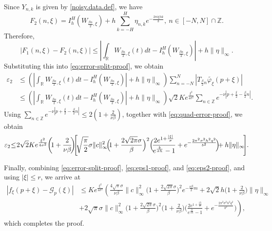 \documentclass[11pt, reqno]{amsart}
\newcommand{\Z}{\mathbb{Z}}
\newcommand{\R}{\mathbb{R}}
\numberwithin{equation}{section}
\begin{document}
\begin{appendices}
Since  $Y_{n,k}$ is given by  \eqref{noisy.data.def}, we have 
$$ F_2(n,\xi) = I_h^H(W_{\frac{\beta n}{2},\xi}) + h\sum_{k=-H}^{H}\eta_{n,k}e^{-\frac{2\pi i\xi hk}{b}},  \ n\in[-N,N]\cap\Z. $$
Therefore,
$$ |F_1(n,\xi)-F_2(n,\xi)| \le \left| \int_{\R}W_{\frac{\beta n}{2},\xi}(t) dt - I_h^H(W_{\frac{\beta n}{2},\xi}) \right| + h\|\eta\|_\infty.$$
Substituting this into \eqref{eq:error-split-proof}, we obtain
\begin{align*}
\varepsilon_2 &\le \left( \left| \int_{\R}W_{\frac{\beta n}{2},\xi}(t) dt
- I_h^H(W_{\frac{\beta n}{2},\xi}) \right| + h\|\eta\|_\infty \right)
\sum_{n=-N}^{N} \left|T_{\frac{\beta}{2}n}\widetilde{\varphi_\xi}(p+\xi)\right| \\
&\le \left( \left| \int_{\R}W_{\frac{\beta n}{2},\xi}(t) dt - I_h^H(W_{\frac{\beta n}{2},\xi})
\right| +h\|\eta\|_\infty\right)\sqrt{2}K e^{\frac{\xi^2}{4\sigma^2}}
\sum_{n\in\Z}e^{-\nu\left|p+\frac{\xi}{2}-\frac{\beta}{2}n\right|}.
\end{align*}
Using $ \sum_{n\in\Z}e^{-\nu\left|p+\frac{\xi}{2}-\frac{\beta}{2}n\right|} \le 2\left(1+\frac{2}{\nu\beta}\right)$, 
together with \eqref{eq:quad-error-proof}, we obtain
\begin{align}\label{eq:eps2-proof}
\varepsilon_2 \hskip-.03in \le \hskip-.03in  2\sqrt{2}K e^{\frac{\xi^2}{4\sigma^2}} \hskip-.03in \left(\hskip-.03in 1+\frac{2}{\nu\beta} \hskip-.03in\right) \hskip-.06in
\left[ \hskip-.03in \sqrt{\frac{\pi}{2}} \sigma \|c\|_\infty^2 \hskip-.03in \Bigr( \hskip-.03in 1+\frac{2\sqrt{2\pi}\sigma}{\beta}  \Bigr)^2 
\Bigl(\hskip-.03in \frac{2e^{1+\frac{|\xi|}{\sigma}}}{e^{\frac{b}{\sigma h}}-1} + e^{-\frac{2\pi^2\sigma^2 h^2 q^2}{b^2}} \hskip-.03in \Bigr) \hskip-.06in + h\|\eta\|_\infty \hskip-.03in\right]\hskip-.03in.
\end{align}

Finally, combining \eqref{eq:error-split-proof}, \eqref{eq:eps1-proof}, and \eqref{eq:eps2-proof}, and using \(|\xi|\le r\), we arrive at
\begin{align*}
|f_\xi(p+\xi)-\mathcal G_p(\xi)|& \le Ke^{\frac{\xi^2}{4\sigma^2}} \left( \frac{4\sqrt{\pi}\sigma}{\nu\beta}\|c\|_\infty^2\Big(1+\frac{2\sqrt{2\pi}\sigma}{\beta}\Big)^2e^{-\frac{\nu\beta}{2}m} 
+2\sqrt{2}h\Big(1+\frac{2}{\nu\beta}\Big)\|\eta\|_\infty \right.
\nonumber\\
&\left.+2\sqrt{\pi}\sigma\|c\|_\infty^2
\Big(1+\frac{2\sqrt{2\pi}\sigma}{\beta}\Big)^2 \big(1+\frac{2}{\nu\beta}\big)
\Big(\frac{2e^{1+\frac{|\xi|}{\sigma}}}{e^{\frac{b}{\sigma h}}-1}
+e^{-\frac{2\pi^2\sigma^2 h^2 q^2}{b^2}}\Big)\right),
\end{align*}
which completes the proof.




\end{appendices}
\end{document}
